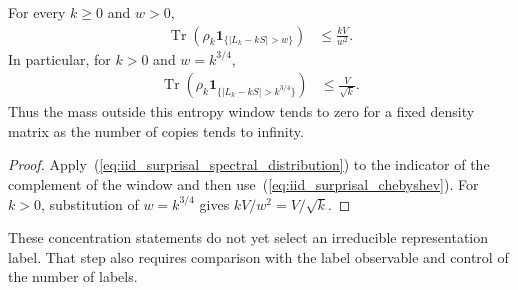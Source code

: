 \begin{theorem}
\label{thm:iid_surprisal_density_tail}
\leanok
{}
For every $k\ge0$ and $w>0$,
\begin{align}
 \operatorname{Tr}\!\left(\rho_k\mathbf1_{\{|L_k-kS|>w\}}\right)
   &\le \frac{kV}{w^2}.
 \label{eq:iid_surprisal_density_tail}
\end{align}
In particular, for $k>0$ and $w=k^{3/4}$,
\begin{align}
 \operatorname{Tr}\!\left(\rho_k\mathbf1_{\{|L_k-kS|>k^{3/4}\}}\right)
   &\le \frac{V}{\sqrt{k}}.
 \label{eq:iid_surprisal_rate}
\end{align}
Thus the mass outside this entropy window tends to zero for a fixed density
matrix as the number of copies tends to infinity.
\end{theorem}
\begin{proof}
\leanok
Apply~(\ref{eq:iid_surprisal_spectral_distribution}) to the indicator of
the complement of the window and then use~(\ref{eq:iid_surprisal_chebyshev}).
For $k>0$, substitution of $w=k^{3/4}$ gives
$kV/w^2=V/\sqrt{k}$.
\end{proof}

These concentration statements do not yet select an irreducible
representation label. That step also requires comparison with the label
observable and control of the number of labels.
